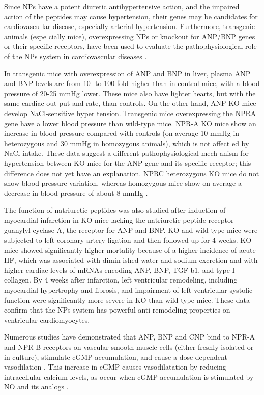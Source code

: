 \documentclass[14pt,a4paper,onecolumn]{extarticle}
\begin{document}
Since NPs have a potent diuretic antihypertensive action, and the impaired action of the peptides may cause hypertension, their genes may be candidates for cardiovascu lar disease, especially arterial hypertension. Furthermore, transgenic animals (espe cially mice), overexpressing NPs or knockout for ANP/BNP genes or their specific receptors, have been used to evaluate the pathophysiological role of the NPs system in cardiovascular diseases \citep{251}.



In transgenic mice with overexpression of ANP and BNP in liver, plasma ANP and BNP levels are from 10- to 100-fold higher than in control mice, with a blood pressure of 20-25 mmHg lower. These mice also have lighter hearts, but with the same cardiac out put and rate, than controls.  On the other hand, ANP KO mice develop NaCl-sensitive hyper tension. Transgenic mice overexpressing the NPRA gene have  a lower blood pressure than wild-type mice. NPR-A KO mice show an increase in blood pressure compared with controls (on average 10 mmHg in heterozygous and 30 mmHg in homozygous animals), which is not affect ed by NaCl intake. These data suggest a different pathophysiological mech anism for hypertension between KO mice for the ANP gene and its specific receptor; this difference does not yet have an explanation. NPRC heterozygous KO mice do not show blood pressure variation, whereas homozygous mice show on average a decrease in blood pressure of about 8 mmHg \citep{251}.



The function of natriuretic peptides was also studied after induction of myocardial infarction in KO mice lacking the natriuretic peptide receptor guanylyl cyclase-A, the receptor for ANP and BNP. KO and wild-type mice were subjected to left coronary artery ligation and then followed-up for 4 weeks. KO mice showed significantly higher mortality because of a higher incidence of acute HF, which was associated with dimin ished water and sodium excretion and with higher cardiac levels of mRNAs encoding ANP, BNP, TGF-b1, and type I collagen. By 4 weeks after infarction, left ventricular remodeling, including myocardial hypertrophy and fibrosis, and impairment of left ventricular systolic function were significantly more severe in KO than wild-type mice. These data confirm that the NPs system has powerful anti-remodeling properties on ventricular cardiomyocytes.\citep{89}



Numerous studies have demonstrated that ANP, BNP and CNP bind to NPR-A and NPR-B receptors on vascular smooth muscle cells (either freshly isolated or in culture), stimulate cGMP accumulation, and cause a dose dependent vasodilation  \citep{269} \citep{270} \citep{271}. This increase in cGMP causes vasodilatation by reducing intracellular calcium levels, as occur when cGMP accumulation is stimulated by NO and its analogs .
\end{document}
